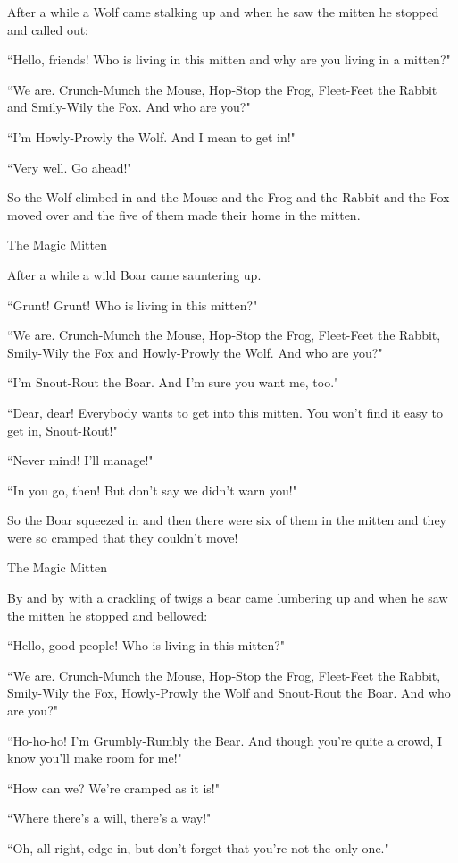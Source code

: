 \documentclass{article}
\begin{document}
After a while a Wolf came stalking up and when he saw the mitten he stopped and called out:

``Hello, friends! Who is living in this mitten and why are you living in a mitten?"

``We are. Crunch-Munch the Mouse, Hop-Stop the Frog, Fleet-Feet the Rabbit and Smily-Wily the Fox. And who are you?"

``I'm Howly-Prowly the Wolf. And I mean to get in!"

``Very well. Go ahead!"

So the Wolf climbed in and the Mouse and the Frog and the Rabbit and the Fox moved over and the five of them made their home in the mitten.

The Magic Mitten

After a while a wild Boar came sauntering up.

``Grunt! Grunt! Who is living in this mitten?"

``We are. Crunch-Munch the Mouse, Hop-Stop the Frog, Fleet-Feet the Rabbit, Smily-Wily the Fox and Howly-Prowly the Wolf. And who are you?"

``I'm Snout-Rout the Boar. And I'm sure you want me, too."

``Dear, dear! Everybody wants to get into this mitten. You won't find it easy to get in, Snout-Rout!"

``Never mind! I'll manage!"

``In you go, then! But don't say we didn't warn you!"

So the Boar squeezed in and then there were six of them in the mitten and they were so cramped that they couldn't move!

The Magic Mitten

By and by with a crackling of twigs a bear came lumbering up and when he saw the mitten he stopped and bellowed:

``Hello, good people! Who is living in this mitten?"

``We are. Crunch-Munch the Mouse, Hop-Stop the Frog, Fleet-Feet the Rabbit, Smily-Wily the Fox, Howly-Prowly the Wolf and Snout-Rout the Boar. And who are you?"

``Ho-ho-ho! I'm Grumbly-Rumbly the Bear. And though you're quite a crowd, I know you'll make room for me!"

``How can we? We're cramped as it is!"

``Where there's a will, there's a way!"

``Oh, all right, edge in, but don't forget that you're not the only one."
\end{document}
